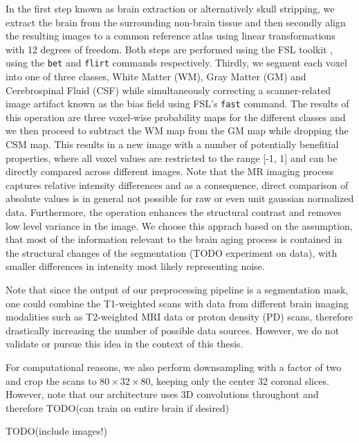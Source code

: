 In the first step known as brain extraction or alternatively skull stripping, we extract the brain from the surrounding non-brain tissue and then secondly align the resulting images to a common reference atlas using linear transformations with 12 degrees of freedom. Both steps are performed using the FSL toolkit \cite{FSL}, using the \texttt{bet} and \texttt{flirt} commands respectively. Thirdly, we segment each voxel into one of three classes, White Matter (WM), Gray Matter (GM) and Cerebrospinal Fluid (CSF) while simultaneously correcting a scanner-related image artifact known as the bias field using FSL's \texttt{fast} command. The results of this operation are three voxel-wise probability maps for the different classes and we then proceed to subtract the WM map from the GM map while dropping the CSM map. This results in a new image with a number of potentially benefitial properties, where all voxel values are restricted to the range [-1, 1] and can be directly compared across different images. Note that the MR imaging process captures relative intensity differences and as a consequence, direct comparison of absolute values is in general not possible for raw or even unit gaussian normalized data. Furthermore, the operation enhances the structural contrast and removes low level variance in the image. We choose this apprach based on the assumption, that most of the information relevant to the brain aging process is contained in the structural changes of the segmentation (TODO experiment on data), with smaller differences in intensity most likely representing noise.

Note that since the output of our preprocessing pipeline is a segmentation mask, one could combine the T1-weighted scans with data from different brain imaging modalities such as T2-weighted MRI data or proton density (PD) scans, therefore drastically increasing the number of possible data sources. However, we do not validate or pursue this idea in the context of this thesis.

For computational reasons, we also perform downsampling with a factor of two and crop the scans to $ 80 \times 32 \times 80 $, keeping only the center 32 coronal slices. However, note that our architecture uses 3D convolutions throughout and therefore TODO(can train on entire brain if desired)

TODO(include images!)

